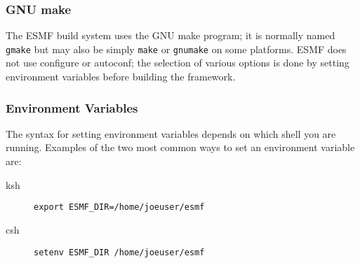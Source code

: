 \subsubsection{GNU make}
The ESMF build system uses the GNU make program; it is normally named 
{\tt gmake} but may also be simply {\tt make} or {\tt gnumake} on some 
platforms.  ESMF does not use configure or autoconf;  the selection of 
various options is done by
setting environment variables before building the framework. 


\subsubsection{Environment Variables}

The syntax for setting environment variables depends on which shell
you are running.  Examples of the two most common ways to set 
an environment variable are:
\begin{description}
\item[ksh] {\tt  export ESMF\_DIR=/home/joeuser/esmf}
\item[csh] {\tt  setenv ESMF\_DIR /home/joeuser/esmf}
\end{description}

